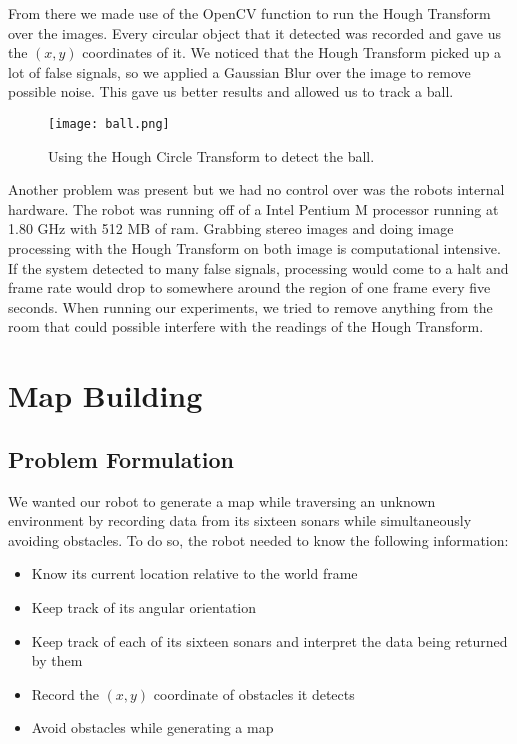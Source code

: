\documentclass[12pt]{article}
\begin{document}
From there we made use of the OpenCV function to run the Hough Transform over the images. Every circular object that it detected was recorded and gave us the $(x,y)$ coordinates of it. We noticed that the Hough Transform picked up a lot of false signals, so we applied a Gaussian Blur over the image to remove possible noise. This gave us better results and allowed us to track a ball.

\begin{figure}[htp!]
	\begin{center}
		\texttt{[image: ball.png]}
		\caption{Using the Hough Circle Transform to detect the ball.} \label{fig.circle}
	\end{center}
\end{figure}

Another problem was present but we had no control over was the robots internal hardware. The robot was running off of a Intel Pentium M processor running at 1.80 GHz with 512 MB of ram. Grabbing stereo images and doing image processing with the Hough Transform on both image is computational intensive. If the system detected to many false signals, processing would come to a halt and frame rate would drop to somewhere around the region of one frame every five seconds. When running our experiments, we tried to remove anything from the room that could possible interfere with the readings of the Hough Transform.


\newpage
\section{Map Building}


\subsection{Problem Formulation}


We wanted our robot to generate a map while traversing an unknown environment by recording data from its sixteen sonars while simultaneously avoiding obstacles. To do so, the robot needed to know the following information:
\begin{itemize}
	\item Know its current location relative to the world frame
	\item Keep track of its angular orientation
	\item Keep track of each of its sixteen sonars and interpret the data being returned by them
	\item Record the $(x,y)$ coordinate of obstacles it detects
	\item Avoid obstacles while generating a map
\end{itemize}
\end{document}
